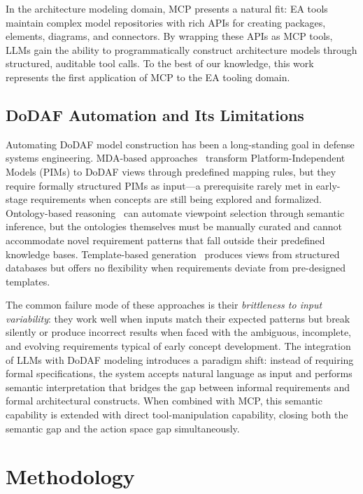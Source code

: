 \documentclass{ieeeaccess}
\begin{document}
In the architecture modeling domain, MCP presents a natural fit: EA tools maintain complex model repositories with rich APIs for creating packages, elements, diagrams, and connectors. By wrapping these APIs as MCP tools, LLMs gain the ability to programmatically construct architecture models through structured, auditable tool calls. To the best of our knowledge, this work represents the first application of MCP to the EA tooling domain.

\subsection{DoDAF Automation and Its Limitations}

Automating DoDAF model construction has been a long-standing goal in defense systems engineering. MDA-based approaches~\cite{mda_dodaf} transform Platform-Independent Models (PIMs) to DoDAF views through predefined mapping rules, but they require formally structured PIMs as input---a prerequisite rarely met in early-stage requirements when concepts are still being explored and formalized. Ontology-based reasoning~\cite{ontology_dodaf} can automate viewpoint selection through semantic inference, but the ontologies themselves must be manually curated and cannot accommodate novel requirement patterns that fall outside their predefined knowledge bases. Template-based generation~\cite{template_dodaf} produces views from structured databases but offers no flexibility when requirements deviate from pre-designed templates.

The common failure mode of these approaches is their \emph{brittleness to input variability}: they work well when inputs match their expected patterns but break silently or produce incorrect results when faced with the ambiguous, incomplete, and evolving requirements typical of early concept development. The integration of LLMs with DoDAF modeling introduces a paradigm shift: instead of requiring formal specifications, the system accepts natural language as input and performs semantic interpretation that bridges the gap between informal requirements and formal architectural constructs. When combined with MCP, this semantic capability is extended with direct tool-manipulation capability, closing both the semantic gap and the action space gap simultaneously.

\section{Methodology}
\label{sec:methodology}
\end{document}
